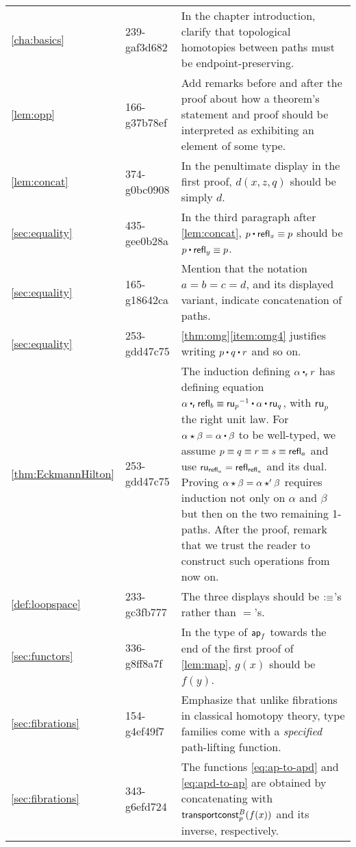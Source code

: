 \documentclass[
%
%
11pt %
]{article}
\newcounter{chapter}            %
\begin{document}
\begin{longtable}{llp{10.5cm}}
  \cref{cha:basics}
  & 239-gaf3d682
  & In the chapter introduction, clarify that topological homotopies between paths must be endpoint-preserving.\\
  \cref{lem:opp}
  & 166-g37b78ef
  & Add remarks before and after the proof about how a theorem's statement and proof should be interpreted as exhibiting an element of some type.\\
  \cref{lem:concat}
  & 374-g0bc0908
  & In the penultimate display in the first proof, $d(x,z,q)$ should be simply $d$.\\
  \cref{sec:equality}
  & 435-gee0b28a
  & In the third paragraph after \cref{lem:concat}, $p\ct\refl{x}\jdeq p$ should be $p\ct\refl{y}\jdeq p$.\\
  \cref{sec:equality}
  & 165-g18642ca
  & Mention that the notation $a=b=c=d$, and its displayed variant, indicate concatenation of paths.\\
  \cref{sec:equality}
  & 253-gdd47c75
  & \cref{thm:omg}\ref{item:omg4} justifies writing $p\ct q \ct r$ and so on.\\
  \cref{thm:EckmannHilton}
  & 253-gdd47c75
  & The induction defining $\alpha\rightwhisker r$ has defining equation $\alpha \rightwhisker \refl{b} \jdeq \opp{\mathsf{ru}_p} \ct \alpha \ct \mathsf{ru}_q$, with $\mathsf{ru}_p$ the right unit law.
  For $\alpha\hct\beta = \alpha\ct\beta$ to be well-typed, we assume $p\equiv q \equiv r \equiv s\equiv \mathsf{refl}_{a}$ and use $\mathsf{ru}_{\mathsf{refl}_{a}} = \mathsf{refl}_{\mathsf{refl}_{a}}$ and its dual.
  Proving $\alpha\star\beta = \alpha\star'\beta$ requires induction not only on $\alpha$ and $\beta$ but then on the two remaining 1-paths.
  After the proof, remark that we trust the reader to construct such operations from now on.\\
  \cref{def:loopspace}
  & 233-gc3fb777
  & The three displays should be $\vcentcolon\equiv$'s rather than $=$'s.\\
  \cref{sec:functors}
  & 336-g8ff8a7f
  & In the type of $\mathsf{ap}_{f}$ towards the end of the first proof of \cref{lem:map}, $g(x)$ should be $f(y)$.\\
  \cref{sec:fibrations}
  & 154-g4ef49f7
  & Emphasize that unlike fibrations in classical homotopy theory, type families come with a \emph{specified} path-lifting function.\\
  \cref{sec:fibrations}
  & 343-g6efd724
  & The functions \cref{eq:ap-to-apd} and \cref{eq:apd-to-ap} are obtained by concatenating with $\mathsf{transportconst}^{B}_{p}(f(x))$ and its inverse, respectively.\\

\end{longtable}
\end{document}
